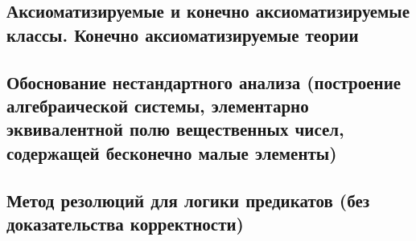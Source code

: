 \documentclass[a4paper]{article}
\theoremstyle{definition}
\theoremstyle{remark}
\begin{document}
    \subsection{Аксиоматизируемые и конечно аксиоматизируемые классы. Конечно аксиоматизируемые теории}
    \subsection{Обоснование нестандартного анализа (построение алгебраической системы, элементарно эквивалентной полю вещественных чисел, содержащей бесконечно малые элементы)}
    \subsection{Метод резолюций для логики предикатов (без доказательства корректности)}


\end{document}
